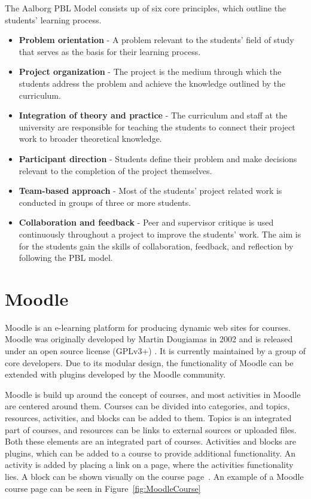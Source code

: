 The Aalborg PBL Model consists up of six core principles, which outline the students' learning process.
\begin{itemize}
	\item \textbf{Problem orientation} - A problem relevant to the students' field of study that serves as the basis for their learning process.
	\item \textbf{Project organization} - The project is the medium through which the students address the problem and achieve the knowledge outlined by the curriculum.
	\item \textbf{Integration of theory and practice} - The curriculum and staff at the university are responsible for teaching the students to connect their project work to broader theoretical knowledge.
	\item \textbf{Participant direction} - Students define their problem and make decisions relevant to the completion of the project themselves.
	\item \textbf{Team-based approach} - Most of the students' project related work is conducted in groups of three or more students.
	\item \textbf{Collaboration and feedback} - Peer and supervisor critique is used continuously throughout a project to improve the students' work.
	The aim is for the students gain the skills of collaboration, feedback, and reflection by following the PBL model. 
\end{itemize}

\section{Moodle}
Moodle is an e-learning platform for producing dynamic web sites for courses. 
Moodle was originally developed by Martin Dougiamas in 2002 and is released under an open source license (GPLv3+) \citep{gpl}. 
It is currently maintained by a group of core developers. 
Due to its modular design, the functionality of Moodle can be extended with plugins developed by the Moodle community.

Moodle is build up around the concept of courses, and most activities in Moodle are centered around them. 
Courses can be divided into categories, and topics, resources, activities, and blocks can be added to them. 
Topics is an integrated part of courses, and resources can be links to external sources or uploaded files. 
Both these elements are an integrated part of courses. 
Activities and blocks are plugins, which can be added to a course to provide additional functionality. 
An activity is added by placing a link on a page, where the activities functionality lies. 
A block can be shown visually on the course page~\citep{moodleStructural}.
An example of a Moodle course page can be seen in Figure~\ref{fig:MoodleCourse}

